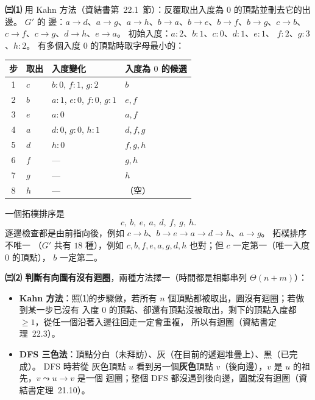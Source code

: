 \begin{pastsoln}
\textbf{㈢⑴} 用 Kahn 方法（資結書第~22.1~節）：反覆取出入度為 $0$ 的頂點並刪去它的出邊。 $G'$ 的
邊：$a \to d$、$a \to g$、$a \to h$、$b \to a$、$b \to e$、$b \to f$、$b \to g$、$c \to b$、
$c \to f$、$c \to g$、$d \to h$、$e \to a$。 初始入度：$a{:}2$、$b{:}1$、$c{:}0$、$d{:}1$、$e{:}1$、
$f{:}2$、$g{:}3$、$h{:}2$。 有多個入度 $0$ 的頂點時取字母最小的：
\begin{center}
\small
\begin{tabular}{clll}
\toprule
步 & 取出 & 入度變化 & 入度為 $0$ 的候選 \\
\midrule
1 & $c$ & $b{:}0$, $f{:}1$, $g{:}2$ & $b$ \\
2 & $b$ & $a{:}1$, $e{:}0$, $f{:}0$, $g{:}1$ & $e, f$ \\
3 & $e$ & $a{:}0$ & $a, f$ \\
4 & $a$ & $d{:}0$, $g{:}0$, $h{:}1$ & $d, f, g$ \\
5 & $d$ & $h{:}0$ & $f, g, h$ \\
6 & $f$ & — & $g, h$ \\
7 & $g$ & — & $h$ \\
8 & $h$ & — & （空） \\
\bottomrule
\end{tabular}
\end{center}
一個拓樸排序是
\[
c,\ b,\ e,\ a,\ d,\ f,\ g,\ h .
\]
逐邊檢查都是由前指向後，例如 $c \to b$、$b \to e \to a \to d \to h$、$a \to g$。 拓樸排序不唯一
（$G'$ 共有 $18$ 種），例如 $c, b, f, e, a, g, d, h$ 也對；但 $c$ 一定第一（唯一入度 $0$ 的頂點），
$b$ 一定第二。

\textbf{㈢⑵ 判斷有向圖有沒有迴圈}，兩種方法擇一（時間都是相鄰串列 $\Theta(n + m)$）：
\begin{itemize}[nosep]
\item \textbf{Kahn 方法}：照⑴的步驟做，若所有 $n$ 個頂點都被取出，圖沒有迴圈；若做到某一步已沒有
入度 $0$ 的頂點、卻還有頂點沒被取出，剩下的頂點入度都 $\ge 1$，從任一個沿著入邊往回走一定會重複，
所以有迴圈（資結書定理~22.3）。
\item \textbf{DFS 三色法}：頂點分白（未拜訪）、灰（在目前的遞迴堆疊上）、黑（已完成）。 DFS 時若從
灰色頂點 $u$ 看到另一個\textbf{灰色}頂點 $v$（後向邊），$v$ 是 $u$ 的祖先，$v \leadsto u \to v$ 是一個
迴圈；整個 DFS 都沒遇到後向邊，圖就沒有迴圈（資結書定理~21.10）。
\end{itemize}
\end{pastsoln}
